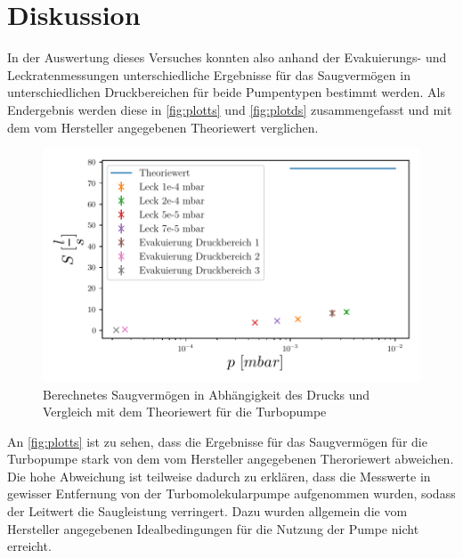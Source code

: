 \section{Diskussion}
\label{sec:Diskussion}

In der Auswertung dieses Versuches konnten also anhand der Evakuierungs- und Leckratenmessungen unterschiedliche Ergebnisse für das Saugvermögen in unterschiedlichen Druckbereichen für beide Pumpentypen bestimmt werden.  Als Endergebnis werden diese in \autoref{fig:plotts} und \autoref{fig:plotds} zusammengefasst und mit dem vom Hersteller angegebenen Theoriewert verglichen.

\begin{figure}[H]
    \centering
    \includegraphics{build/plots/saug_turbo.pdf}
    \caption{Berechnetes Saugvermögen in Abhängigkeit des Drucks und Vergleich mit dem Theoriewert für die Turbopumpe}
    \label{fig:plotts}
  \end{figure}
\noindent
An \autoref{fig:plotts} ist zu sehen, dass die Ergebnisse für das Saugvermögen für die Turbopumpe stark von dem vom Hersteller angegebenen Theroriewert abweichen. Die hohe Abweichung ist teilweise dadurch zu erklären, dass die Messwerte in gewisser Entfernung von der Turbomolekularpumpe aufgenommen wurden, sodass der Leitwert die Saugleistung verringert. Dazu wurden allgemein die vom Hersteller angegebenen Idealbedingungen für die Nutzung der Pumpe nicht erreicht.


